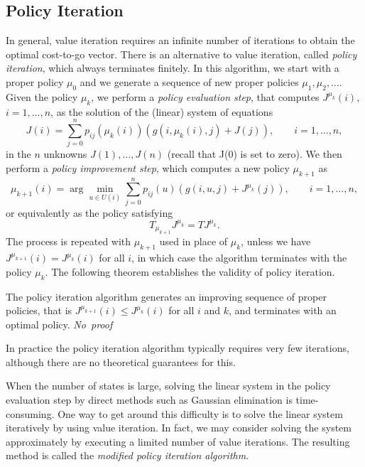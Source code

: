 \subsection{Policy Iteration} \label{sec:policyiteration}
In general, value iteration requires an infinite number of iterations to obtain the optimal cost-to-go vector. There is an alternative to value iteration, called \emph{policy iteration}, which always terminates finitely. In this algorithm, we start with a proper policy $\mu_0$ and we generate a sequence of new proper policies $\mu_1, \mu_2, \ldots$. Given the policy $\mu_k$, we perform a \emph{policy evaluation step}, that computes $J^{\mu_k}(i)$, $i = 1,\ldots,n$, as the solution of the (linear) system of equations
\begin{equation} \label{equ:policyevaluation}
J(i) = \sum^n_{j=0} p_{ij}\left(\mu_k(i)\right)\left(g(i,\mu_k(i),j) + J(j)\right), \qquad i = 1,\ldots,n,
\end{equation}
in the $n$ unknowns $J(1),\ldots,J(n)$ (recall that J(0) is set to zero). We then perform a \emph{policy improvement step}, which computes a new policy $\mu_{k+1}$ as 
\begin{equation} \label{equ:policyimprovement}
\mu_{k+1}(i) = \arg \min_{u \in U(i)} \sum^n_{j=0} p_{ij}(u)\left(g(i,u,j) + J^{\mu_k}(j)\right), \qquad i = 1,\dots,n,
\end{equation}
or equivalently as the policy satisfying
$$T_{\mu_{k+1}}J^{\mu_k} = TJ^{\mu_k}.$$
The process is repeated with $\mu_{k+1}$ used in place of $\mu_k$, unless we have $J^{\mu_{k+1}}(i) = J^{\mu_k}(i)$ for all $i$, in which case the algorithm terminates with the policy $\mu_k$. The following theorem establishes the validity of policy iteration.
\begin{theorem}
The policy iteration algorithm generates an improving sequence of proper policies, that is $J^{\mu_{k+1}}(i) \leq J^{\mu_k}(i)$ for all $i$ and $k$, and terminates with an optimal policy. \hfill {\it No~proof}
\end{theorem} 
In practice the policy iteration algorithm typically requires very few iterations, although there are no theoretical guarantees for this.


When the number of states is large, solving the linear system in the policy evaluation step by direct methods such as Gaussian elimination is time-consuming. One way to get around this difficulty is to solve the linear system iteratively by using value iteration. In fact, we may consider solving the system approximately by executing a limited number of value iterations. The resulting method is called the \emph{modified policy iteration algorithm}.

